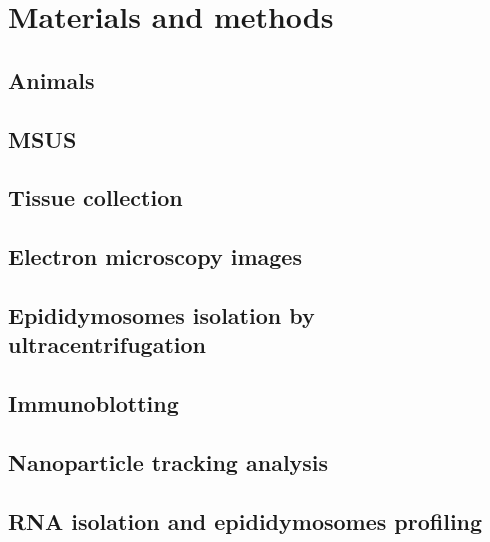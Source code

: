 \documentclass[12pt,twoside]{reedthesis}
\begin{document}
\hypertarget{materials-and-methods}{%
\section{Materials and methods}\label{materials-and-methods}}

\hypertarget{animals}{%
\subsection{Animals}\label{animals}}

\hypertarget{msus}{%
\subsection{MSUS}\label{msus}}

\hypertarget{tissue-collection}{%
\subsection{Tissue collection}\label{tissue-collection}}

\hypertarget{electron-microscopy-images}{%
\subsection{Electron microscopy images}\label{electron-microscopy-images}}

\hypertarget{epididymosomes-isolation-by-ultracentrifugation}{%
\subsection{Epididymosomes isolation by ultracentrifugation}\label{epididymosomes-isolation-by-ultracentrifugation}}

\hypertarget{immunoblotting}{%
\subsection{Immunoblotting}\label{immunoblotting}}

\hypertarget{nanoparticle-tracking-analysis}{%
\subsection{Nanoparticle tracking analysis}\label{nanoparticle-tracking-analysis}}

\hypertarget{rna-isolation-and-epididymosomes-profiling}{%
\subsection{RNA isolation and epididymosomes profiling}\label{rna-isolation-and-epididymosomes-profiling}}
\end{document}
